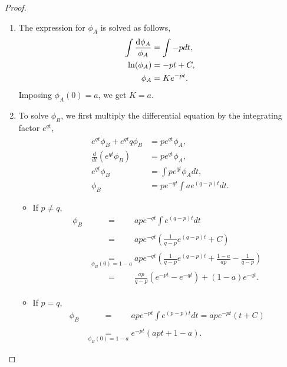 \begin{proof}
    \hfill
    \begin{enumerate}
        \item The expression for $\phi_A$ is solved as follows,
        \begin{align*}
            \int\frac{\mathrm{d}\phi_A}{\phi_A}&=\int-pdt,\\
            \ln(\phi_A)&=-pt+C,\\
            \phi_A&=Ke^{-pt}.
        \end{align*}
        Imposing $\phi_A(0)=a$, we get $K=a$.

        \item To solve $\phi_B$, we first multiply the differential equation by the integrating factor $e^{qt}$,
        \begin{align*}
            e^{qt}\dot\phi_B+e^{qt}q\phi_B&=pe^{qt}\phi_A,\\
            \frac{d}{dt}(e^{qt}\phi_B)&=pe^{qt}\phi_A,\\
            e^{qt}\phi_B&=\int pe^{qt}\phi_A dt,\\
            \phi_B&=pe^{-qt}\int ae^{(q-p)t}dt.
        \end{align*}

        \begin{itemize}

            \item If $p\neq q$,
            \begin{align*}
                \phi_B &\underset{\phantom{\phi_B(0) = 1-a}}{=} ape^{-qt}\int e^{(q-p)t}dt\\
                &\underset{{\phantom{\phi_B(0) = 1-a}}}{=} ape^{-qt}\left(\frac{1}{q-p}e^{(q-p)t}+C\right) \\
                &\underset{\phi_B(0) = 1-a}{=} ape^{-qt}\left(\frac{1}{q-p}e^{(q-p)t}
                +\frac{1-a}{ap}-\frac{1}{q-p}\right)\\
                &\underset{\phantom{\phi_B(0) = 1-a}}{=} \frac{ap}{q-p}\left(e^{-pt}-e^{-qt}\right)+(1-a)e^{-qt}.
            \end{align*}

            \item If $p=q$,
            \begin{align*}
                \phi_B &\underset{\phantom{\phi_B(0) = 1-a}}{=} ape^{-pt}\int e^{(p-p)t}dt = ape^{-pt}(t + C)\\ 
                &\underset{\phi_B(0) = 1-a}{=} e^{-pt}(apt + 1 - a).
            \end{align*}


\end{itemize}
\end{enumerate}
\end{proof}
